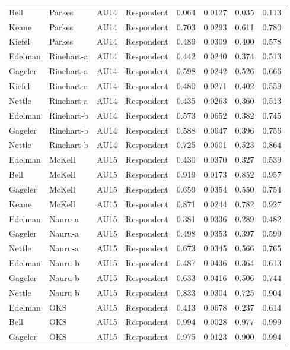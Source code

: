 \documentclass{monashthesis}
\begin{document}
\begin{center}
\begin{longtable}{llllllll}
Bell & Parkes & AU14 & Respondent & 0.064 & 0.0127 & 0.035 & 0.113 \\
Keane & Parkes & AU14 & Respondent & 0.703 & 0.0293 & 0.611 & 0.780 \\
Kiefel & Parkes & AU14 & Respondent & 0.489 & 0.0309 & 0.400 & 0.578 \\
Edelman & Rinehart-a & AU14 & Respondent & 0.442 & 0.0240 & 0.374 & 0.513 \\
Gageler & Rinehart-a & AU14 & Respondent & 0.598 & 0.0242 & 0.526 & 0.666 \\
Kiefel & Rinehart-a & AU14 & Respondent & 0.480 & 0.0271 & 0.402 & 0.559 \\
Nettle & Rinehart-a & AU14 & Respondent & 0.435 & 0.0263 & 0.360 & 0.513 \\
Edelman & Rinehart-b & AU14 & Respondent & 0.573 & 0.0652 & 0.382 & 0.745 \\
Gageler & Rinehart-b & AU14 & Respondent & 0.588 & 0.0647 & 0.396 & 0.756 \\
Nettle & Rinehart-b & AU14 & Respondent & 0.725 & 0.0601 & 0.523 & 0.864 \\
Edelman & McKell & AU15 & Respondent & 0.430 & 0.0370 & 0.327 & 0.539 \\
Bell & McKell & AU15 & Respondent & 0.919 & 0.0173 & 0.852 & 0.957 \\
Gageler & McKell & AU15 & Respondent & 0.659 & 0.0354 & 0.550 & 0.754 \\
Keane & McKell & AU15 & Respondent & 0.871 & 0.0244 & 0.782 & 0.927 \\
Edelman & Nauru-a & AU15 & Respondent & 0.381 & 0.0336 & 0.289 & 0.482 \\
Gageler & Nauru-a & AU15 & Respondent & 0.498 & 0.0353 & 0.397 & 0.599 \\
Nettle & Nauru-a & AU15 & Respondent & 0.673 & 0.0345 & 0.566 & 0.765 \\
Edelman & Nauru-b & AU15 & Respondent & 0.487 & 0.0436 & 0.364 & 0.613 \\
Gageler & Nauru-b & AU15 & Respondent & 0.633 & 0.0416 & 0.506 & 0.744 \\
Nettle & Nauru-b & AU15 & Respondent & 0.833 & 0.0304 & 0.725 & 0.904 \\
Edelman & OKS & AU15 & Respondent & 0.413 & 0.0678 & 0.237 & 0.614 \\
Bell & OKS & AU15 & Respondent & 0.994 & 0.0028 & 0.977 & 0.999 \\
Gageler & OKS & AU15 & Respondent & 0.975 & 0.0123 & 0.900 & 0.994 \\

\end{longtable}
\end{center}
\end{document}
